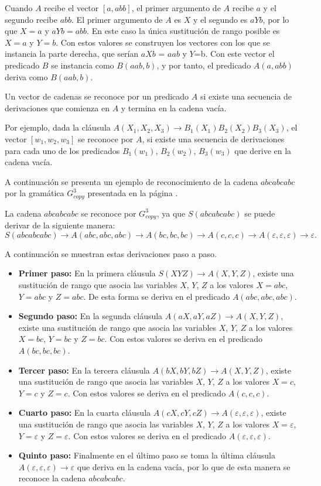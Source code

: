 \documentclass{article}
\begin{document}
Cuando $A$ recibe el vector $[a,abb]$, el primer argumento de $A$ recibe $a$ y el segundo recibe $abb$.  El primer argumento de $A$ es $X$ y el segundo es $aYb$, por lo que $X=a$ y $aYb=abb$. En este caso la única sustitución de rango posible es $X=a$ y $Y=b$. Con estos valores se construyen los vectores con los que se instancia la parte derecha, que serían $aXb$ = $aab$ y $Y$=b. Con este vector el predicado $B$ se instancia como $B(aab,b)$, y por tanto, el predicado $A(a,abb)$ deriva como $B(aab,b)$.


Un vector de cadenas se reconoce por un predicado $A$ si existe una secuencia de derivaciones que comienza en $A$ y termina en la cadena vacía.

Por ejemplo, dada la cláusula $A(X_1,X_2,X_3)\to B_1(X_1)B_2(X_2)B_3(X_3)$, el vector $[w_1,w_2,w_3]$ se reconoce por $A$, si existe una secuencia de derivaciones para cada uno de los predicados $B_1(w_1)$, $B_2(w_2)$, $B_3(w_3)$ que derive en la cadena vacía.

A continuación se presenta un ejemplo de reconocimiento de la cadena $abcabcabc$ por la gramática $G^3_{copy}$
presentada en la página \pageref{g_3copy}.

La cadena $abcabcabc$ se reconoce por $G^3_{copy}$, ya que $S(abcabcabc)$ se puede derivar de la siguiente manera:
$$S(abcabcabc)\to A(abc,abc,abc)\to A(bc,bc,bc)\to A(c,c,c)\to A(\varepsilon,\varepsilon,\varepsilon)\to \varepsilon.$$

A continuación se muestran estas derivaciones paso a paso.

\begin{itemize}
    \item \textbf{Primer paso:} En la primera cláusula $S(XYZ)\to A(X,Y,Z)$, existe una sustitución de rango que asocia las variables $X$, $Y$, $Z$ a los valores $X=abc$, $Y=abc$ y $Z=abc$. De esta forma se deriva en el predicado $A(abc,abc,abc)$.
    \item \textbf{Segundo paso:} En la segunda cláusula $A(aX,aY,aZ)\to A(X,Y,Z)$, existe una sustitución de rango que asocia las
          variables $X$, $Y$, $Z$ a los valores $X=bc$, $Y=bc$ y $Z=bc$. Con estos valores se deriva en el predicado $A(bc,bc,bc)$.
    \item \textbf{Tercer paso:} En la tercera cláusula $A(bX,bY,bZ)\to A(X,Y,Z)$, existe una sustitución de rango que asocia las
          variables $X$, $Y$, $Z$ a los valores $X=c$, $Y=c$ y $Z=c$. Con estos valores se deriva en el predicado $A(c,c,c)$.
    \item \textbf{Cuarto paso:} En la cuarta cláusula $A(cX,cY,cZ)\to A(\varepsilon,\varepsilon,\varepsilon)$, existe una sustitución de rango que asocia las variables $X$, $Y$, $Z$ a los valores $X=\varepsilon$, $Y=\varepsilon$ y $Z=\varepsilon$. Con estos valores se deriva en el predicado $A(\varepsilon,\varepsilon,\varepsilon)$.
    \item \textbf{Quinto paso:} Finalmente en el último paso se toma la última cláusula $A(\varepsilon,\varepsilon,\varepsilon)\to \varepsilon$ que deriva en la cadena vacía, por lo que de esta manera se reconoce la cadena $abcabcabc$.
\end{itemize}
\end{document}
